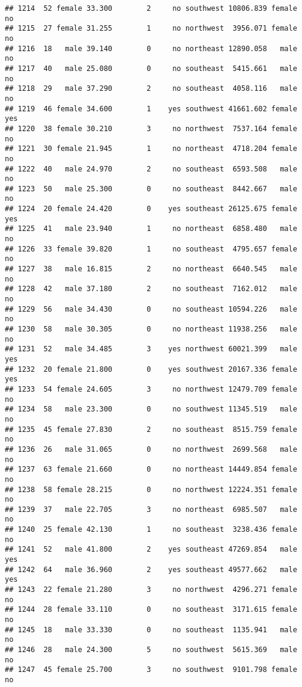 \documentclass[
]{article}
\begin{document}
\begin{verbatim}
## 1214  52 female 33.300        2     no southwest 10806.839 female       no
## 1215  27 female 31.255        1     no northwest  3956.071 female       no
## 1216  18   male 39.140        0     no northeast 12890.058   male       no
## 1217  40   male 25.080        0     no southeast  5415.661   male       no
## 1218  29   male 37.290        2     no southeast  4058.116   male       no
## 1219  46 female 34.600        1    yes southwest 41661.602 female      yes
## 1220  38 female 30.210        3     no northwest  7537.164 female       no
## 1221  30 female 21.945        1     no northeast  4718.204 female       no
## 1222  40   male 24.970        2     no southeast  6593.508   male       no
## 1223  50   male 25.300        0     no southeast  8442.667   male       no
## 1224  20 female 24.420        0    yes southeast 26125.675 female      yes
## 1225  41   male 23.940        1     no northeast  6858.480   male       no
## 1226  33 female 39.820        1     no southeast  4795.657 female       no
## 1227  38   male 16.815        2     no northeast  6640.545   male       no
## 1228  42   male 37.180        2     no southeast  7162.012   male       no
## 1229  56   male 34.430        0     no southeast 10594.226   male       no
## 1230  58   male 30.305        0     no northeast 11938.256   male       no
## 1231  52   male 34.485        3    yes northwest 60021.399   male      yes
## 1232  20 female 21.800        0    yes southwest 20167.336 female      yes
## 1233  54 female 24.605        3     no northwest 12479.709 female       no
## 1234  58   male 23.300        0     no southwest 11345.519   male       no
## 1235  45 female 27.830        2     no southeast  8515.759 female       no
## 1236  26   male 31.065        0     no northwest  2699.568   male       no
## 1237  63 female 21.660        0     no northeast 14449.854 female       no
## 1238  58 female 28.215        0     no northwest 12224.351 female       no
## 1239  37   male 22.705        3     no northeast  6985.507   male       no
## 1240  25 female 42.130        1     no southeast  3238.436 female       no
## 1241  52   male 41.800        2    yes southeast 47269.854   male      yes
## 1242  64   male 36.960        2    yes southeast 49577.662   male      yes
## 1243  22 female 21.280        3     no northwest  4296.271 female       no
## 1244  28 female 33.110        0     no southeast  3171.615 female       no
## 1245  18   male 33.330        0     no southeast  1135.941   male       no
## 1246  28   male 24.300        5     no southwest  5615.369   male       no
## 1247  45 female 25.700        3     no southwest  9101.798 female       no

\end{verbatim}
\end{document}
